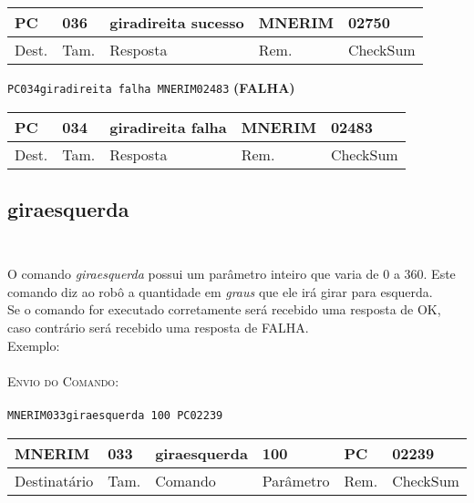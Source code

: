 \documentclass[11pt,	 papera4]{article}
\begin{document}
\begin{table}[h]
	\centering
	\begin{tabular}{p{1cm}p{1cm}p{3.3cm}p{2cm}p{2cm}}
		\toprule
		PC & 036 &giradireita sucesso  & MNERIM & 02750 \\
		\midrule	
		Dest. & Tam. & Resposta & Rem. & CheckSum \\
		\bottomrule
	\end{tabular}
	\label{tab:formatoslatex} %
\end{table}

\hspace*{1.2cm} \texttt{PC034giradireita falha MNERIM02483} \hspace*{2.5cm}\textbf{(FALHA)}

\begin{table}[h]
	\centering
	\begin{tabular}{p{1cm}p{1cm}p{3cm}p{2cm}p{2cm}}
		\toprule
		PC & 034 &giradireita falha  & MNERIM & 02483 \\
		\midrule	
		Dest. & Tam. & Resposta & Rem. & CheckSum \\
		\bottomrule
	\end{tabular}
	\label{tab:formatoslatex} %
\end{table}


\newpage

\subsection*{giraesquerda \\\\}
O comando \textit{giraesquerda} possui um parâmetro inteiro que varia de 0 a 360.
Este comando diz ao robô a quantidade em \textit{graus} que ele irá girar para esquerda.\\
Se o comando for executado corretamente será recebido uma resposta de OK, caso contrário será recebido uma resposta de FALHA. \\
\newline
Exemplo:\\\\ \hspace*{0.5cm} 
\textsc{Envio do Comando:} \\\\ \hspace*{2cm} \texttt{MNERIM033giraesquerda 100 PC02239} \\

\begin{table}[h]
	\centering
	\begin{tabular}{p{2cm}p{1cm}p{2cm}p{2cm}p{1cm}p{2cm}}
		\toprule
		MNERIM & 033 & giraesquerda & 100 & PC & 02239 \\
		\midrule	
		Destinatário & Tam. & Comando & Parâmetro & Rem. & CheckSum \\
		\bottomrule
	\end{tabular}
	\label{tab:formatoslatex} %
\end{table}
\end{document}
